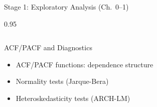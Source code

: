 \documentclass[9pt, aspectratio=169, t]{beamer}
\begin{document}
\begin{frame}{Stage 1: Exploratory Analysis (Ch.\ 0--1)}
\begin{cminipage}{0.95\textwidth}
{\begin{columns}[T]
            \vspace{0.15cm}

            \begin{block}{ACF/PACF and Diagnostics}
                \begin{itemize}\setlength{\itemsep}{0pt}
                    \item ACF/PACF functions: dependence structure
                    \item Normality tests (Jarque-Bera)
                    \item Heteroskedasticity tests (ARCH-LM)
                \end{itemize}
            \end{block}
        \end{columns}
        }
    \end{cminipage}
\end{frame}
\end{document}

